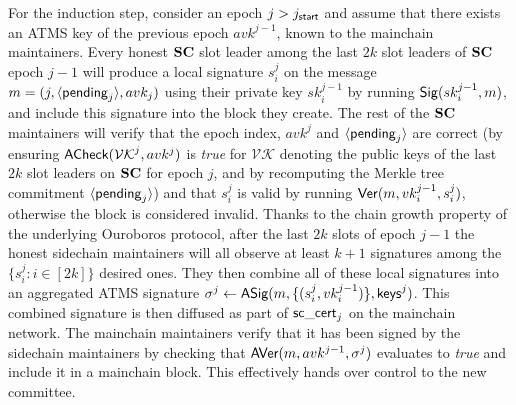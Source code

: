 
For the induction step, consider an  epoch $j>j_{\mathsf{start}}$ and assume that
there exists an ATMS key of the previous epoch $avk^{j-1}$,
known to the mainchain maintainers.
Every honest $\mathbf{SC}$ slot leader
among the last $2k$ slot leaders of $\mathbf{SC}$ epoch $j-1$ will produce a local
signature $s^j_i$ on the message $m = (j,\langle\mathsf{pending}_j\rangle,avk_j)$
using their private key $sk^{j-1}_i$ by running $\mathsf{Sig}(sk^{j-1}_i, m)$, and
include this signature into the block they create.
The rest of the $\mathbf{SC}$ maintainers will
verify that the epoch index, $avk^j$ and $\langle\mathsf{pending}_j\rangle$ are correct (by
ensuring $\textsf{ACheck}(\mathcal{VK}^j, avk^j)$ is \emph{true} for
$\mathcal{VK}$ denoting the public keys of the last $2k$ slot leaders on $\mathbf{SC}$
for epoch $j$,
and by recomputing the Merkle tree commitment
$\langle\mathsf{pending}_j\rangle$) and that $s^j_i$ is valid by running
$\mathsf{Ver}(m, vk^{j-1}_i, s^j_i)$, otherwise the block is considered invalid.
Thanks to the chain growth property of the underlying Ouroboros protocol,
after the last $2k$ slots of epoch $j-1$
the honest sidechain maintainers will all observe at least $k+1$
signatures among the $\{s^j_i: i \in [2k]\}$ desired ones.
They then combine all of these local signatures
into an aggregated ATMS signature $\sigma^j \gets
\textsf{ASig}(m, \{(s^j_i, vk^{j-1}_i)\}, \textsf{keys}^j)$. This combined signature is then
diffused as part of $\mathsf{sc\_cert}_j$ on the mainchain network.
The mainchain maintainers verify that it has been signed by the sidechain
maintainers by checking that
$\textsf{AVer}(m, avk^{j-1}, \sigma^j)$ evaluates to \emph{true} and include
it in a mainchain block. This effectively hands over control to the new
committee.

